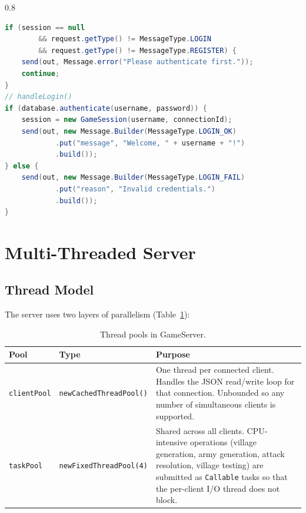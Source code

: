 \documentclass[format=acmsmall, review=false, screen=true]{acmart}
\begin{document}
\begin{spacing}{0.8}
\begin{lstlisting}[language=Java, caption={Server authentication logic in ClientHandler.},
                   label=lst:auth]
if (session == null
        && request.getType() != MessageType.LOGIN
        && request.getType() != MessageType.REGISTER) {
    send(out, Message.error("Please authenticate first."));
    continue;
}
// handleLogin()
if (database.authenticate(username, password)) {
    session = new GameSession(username, connectionId);
    send(out, new Message.Builder(MessageType.LOGIN_OK)
            .put("message", "Welcome, " + username + "!")
            .build());
} else {
    send(out, new Message.Builder(MessageType.LOGIN_FAIL)
            .put("reason", "Invalid credentials.")
            .build());
}
\end{lstlisting}
\end{spacing}

\section{Multi-Threaded Server}

\subsection{Thread Model}

The server uses two layers of parallelism (Table~\ref{tbl:threads}):

\begin{table}[h]
  \centering
  \caption{Thread pools in GameServer.}
  \label{tbl:threads}
  \begin{tabularx}{\linewidth}{llX}
    \toprule
    \textbf{Pool} & \textbf{Type} & \textbf{Purpose} \\
    \midrule
    \texttt{clientPool} & \texttt{newCachedThreadPool()} &
      One thread per connected client.  Handles the JSON
      read/write loop for that connection.  Unbounded so any number
      of simultaneous clients is supported. \\
    \texttt{taskPool}   & \texttt{newFixedThreadPool(4)} &
      Shared across all clients.  CPU-intensive operations
      (village generation, army generation, attack resolution,
      village testing) are submitted as \texttt{Callable} tasks so
      that the per-client I/O thread does not block. \\
    \bottomrule
  \end{tabularx}
\end{table}
\end{document}
